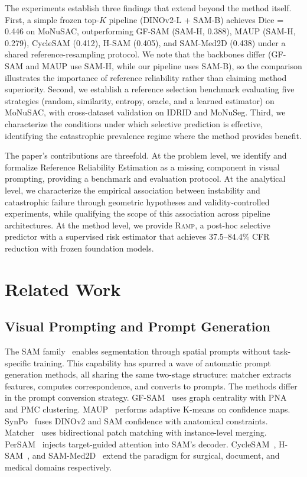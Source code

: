\documentclass[11pt]{article}
\newcommand{\RAMP}{\textsc{Ramp}}
\begin{document}
The experiments establish three findings that extend beyond the method
itself. First, a simple frozen top-$K$ pipeline (DINOv2-L + SAM-B) achieves
Dice = 0.446 on MoNuSAC, outperforming GF-SAM (SAM-H, 0.388), MAUP (SAM-H,
0.279), CycleSAM (0.412), H-SAM (0.405), and SAM-Med2D (0.438) under a
shared reference-resampling protocol. We note that the backbones differ
(GF-SAM and MAUP use SAM-H, while our pipeline uses SAM-B), so the
comparison illustrates the importance of reference reliability rather than
claiming method superiority. Second, we establish a reference selection
benchmark evaluating five strategies (random, similarity, entropy, oracle,
and a learned estimator) on MoNuSAC, with cross-dataset validation on IDRID
and MoNuSeg. Third, we characterize the conditions under which selective
prediction is effective, identifying the catastrophic prevalence regime
where the method provides benefit.

The paper's contributions are threefold. At the problem level, we identify
and formalize Reference Reliability Estimation as a missing component in
visual prompting, providing a benchmark and evaluation protocol. At the
analytical level, we characterize the empirical association between
instability and catastrophic failure through geometric hypotheses and
validity-controlled experiments, while qualifying the scope of this
association across pipeline architectures. At the method level, we provide
\RAMP{}, a post-hoc selective predictor with a supervised risk estimator
that achieves 37.5--84.4\% CFR reduction with frozen foundation models.

\section{Related Work}

\subsection{Visual Prompting and Prompt Generation}

The SAM family~\cite{kirillov2023sam,ravi2024sam2} enables segmentation
through spatial prompts without task-specific training. This capability has
spurred a wave of automatic prompt generation methods, all sharing the same
two-stage structure: matcher extracts features, computes correspondence, and
converts to prompts. The methods differ in the prompt conversion strategy.
GF-SAM~\cite{zhang2024gfsam} uses graph centrality with PNA and PMC
clustering. MAUP~\cite{zhu2025maup} performs adaptive K-means on confidence
maps. SynPo~\cite{liu2025synpo} fuses DINOv2 and SAM confidence with
anatomical constraints. Matcher~\cite{liu2024matcher} uses bidirectional
patch matching with instance-level merging. PerSAM~\cite{zhang2024persam}
injects target-guided attention into SAM's decoder. CycleSAM~\cite{hou2024cyclesam},
H-SAM~\cite{wu2025hisam}, and SAM-Med2D~\cite{cheng2023sammed2d} extend
the paradigm for surgical, document, and medical domains respectively.
\end{document}
